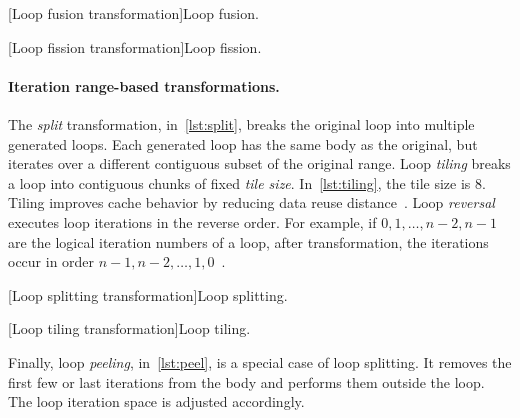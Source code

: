 \begin{center}
\begin{minipage}{\textwidth}
\begin{minipage}[t]{.45\textwidth}
[Loop fusion transformation]{Loop fusion.}
\label{lst:fusion}
\end{minipage}\hfill%
\begin{minipage}[t]{.45\textwidth}
[Loop fission transformation]{Loop fission.}
\label{lst:fission}
\end{minipage}
\end{minipage}
\end{center}

\paragraph*{Iteration range-based transformations.}
The \emph{split} transformation,
in~\autoref{lst:split}, breaks the original loop into multiple generated loops.
Each generated loop has the same body as the original, but iterates over a different contiguous subset of the original range.
Loop \emph{tiling} breaks a loop into contiguous chunks of fixed \emph{tile size}.
In~\autoref{lst:tiling}, the tile size is 8.
Tiling improves cache behavior by reducing data reuse distance~\cite{bertolacci2018}.
Loop \emph{reversal} executes loop iterations in the reverse order.
For example, if \(0, 1,\ldots, n-2, n-1\) are the logical iteration numbers of a loop, after transformation, the iterations occur in order \(n-1, n-2,\ldots, 1, 0\)~\cite{openmp_api}.

\begin{center}
\begin{minipage}{\textwidth}
\begin{minipage}{.45\textwidth}
[Loop splitting transformation]{Loop splitting.}
\label{lst:split}
\end{minipage}\hfill%
\begin{minipage}{.45\textwidth}
[Loop tiling transformation]{Loop tiling.}
\label{lst:tiling}
\end{minipage}
\end{minipage}
\end{center}

Finally, loop \emph{peeling}, in~\autoref{lst:peel}, is a special case of loop splitting.
It removes the first few or last iterations from the body and performs them outside the loop.
The loop iteration space is adjusted accordingly.

